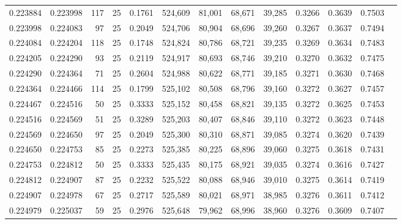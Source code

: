 \begin{tabular}{rrrrrrrrrrrrr}
0.223884 & 0.223998 &   117 &  25 &                                     0.1761 & 524,609 &  81,001 &  68,671 &  39,285 & 0.3266 & 0.3639 & 0.7503 \\
0.223998 & 0.224083 &    97 &  25 &                                     0.2049 & 524,706 &  80,904 &  68,696 &  39,260 & 0.3267 & 0.3637 & 0.7494 \\
0.224084 & 0.224204 &   118 &  25 &                                     0.1748 & 524,824 &  80,786 &  68,721 &  39,235 & 0.3269 & 0.3634 & 0.7483 \\
0.224205 & 0.224290 &    93 &  25 &                                     0.2119 & 524,917 &  80,693 &  68,746 &  39,210 & 0.3270 & 0.3632 & 0.7475 \\
0.224290 & 0.224364 &    71 &  25 &                                     0.2604 & 524,988 &  80,622 &  68,771 &  39,185 & 0.3271 & 0.3630 & 0.7468 \\
0.224364 & 0.224466 &   114 &  25 &                                     0.1799 & 525,102 &  80,508 &  68,796 &  39,160 & 0.3272 & 0.3627 & 0.7457 \\
0.224467 & 0.224516 &    50 &  25 &                                     0.3333 & 525,152 &  80,458 &  68,821 &  39,135 & 0.3272 & 0.3625 & 0.7453 \\
0.224516 & 0.224569 &    51 &  25 &                                     0.3289 & 525,203 &  80,407 &  68,846 &  39,110 & 0.3272 & 0.3623 & 0.7448 \\
0.224569 & 0.224650 &    97 &  25 &                                     0.2049 & 525,300 &  80,310 &  68,871 &  39,085 & 0.3274 & 0.3620 & 0.7439 \\
0.224650 & 0.224753 &    85 &  25 &                                     0.2273 & 525,385 &  80,225 &  68,896 &  39,060 & 0.3275 & 0.3618 & 0.7431 \\
0.224753 & 0.224812 &    50 &  25 &                                     0.3333 & 525,435 &  80,175 &  68,921 &  39,035 & 0.3274 & 0.3616 & 0.7427 \\
0.224812 & 0.224907 &    87 &  25 &                                     0.2232 & 525,522 &  80,088 &  68,946 &  39,010 & 0.3275 & 0.3614 & 0.7419 \\
0.224907 & 0.224978 &    67 &  25 &                                     0.2717 & 525,589 &  80,021 &  68,971 &  38,985 & 0.3276 & 0.3611 & 0.7412 \\
0.224979 & 0.225037 &    59 &  25 &                                     0.2976 & 525,648 &  79,962 &  68,996 &  38,960 & 0.3276 & 0.3609 & 0.7407 \\

\end{tabular}
